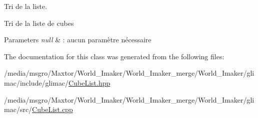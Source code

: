 Tri de la liste. 

Tri de la liste de cubes


\begin{DoxyParams}{Parameters}
{\em null} & \+: aucun paramètre nécessaire \\
\hline
\end{DoxyParams}


The documentation for this class was generated from the following files\+:\begin{DoxyCompactItemize}
\item 
/media/msgro/\+Maxtor/\+World\+\_\+\+Imaker/\+World\+\_\+\+Imaker\+\_\+merge/\+World\+\_\+\+Imaker/glimac/include/glimac/\hyperlink{CubeList_8hpp}{Cube\+List.\+hpp}\item 
/media/msgro/\+Maxtor/\+World\+\_\+\+Imaker/\+World\+\_\+\+Imaker\+\_\+merge/\+World\+\_\+\+Imaker/glimac/src/\hyperlink{CubeList_8cpp}{Cube\+List.\+cpp}\end{DoxyCompactItemize}
